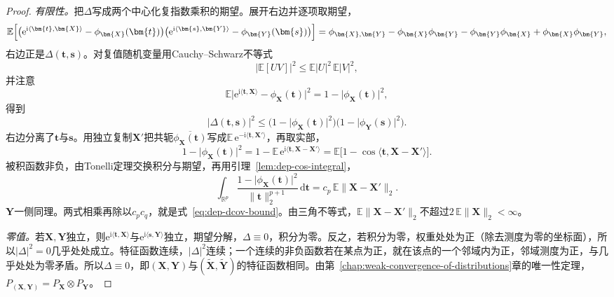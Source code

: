 \begin{proof}
\emph{有限性。}把$\Delta$写成两个中心化复指数乘积的期望。展开右边并逐项取期望，
\[
  \mathbb{E}\Bigl[\bigl(\mathrm{e}^{\mathrm{i}\langle\bm{t},\bm{X}\rangle}-\phi_{\bm{X}}(\bm{t})\bigr)\bigl(\mathrm{e}^{\mathrm{i}\langle\bm{s},\bm{Y}\rangle}-\phi_{\bm{Y}}(\bm{s})\bigr)\Bigr]=\phi_{\bm{X},\bm{Y}}-\phi_{\bm{X}}\phi_{\bm{Y}}-\phi_{\bm{Y}}\phi_{\bm{X}}+\phi_{\bm{X}}\phi_{\bm{Y}},
\]
右边正是$\Delta(\bm{t},\bm{s})$。对复值随机变量用Cauchy--Schwarz不等式
\[
  \lvert\mathbb{E}[UV]\rvert^{2}\leq\mathbb{E}\lvert U\rvert^{2}\,\mathbb{E}\lvert V\rvert^{2},
\]
并注意
\[
  \mathbb{E}\bigl\lvert\mathrm{e}^{\mathrm{i}\langle\bm{t},\bm{X}\rangle}-\phi_{\bm{X}}(\bm{t})\bigr\rvert^{2}=1-\lvert\phi_{\bm{X}}(\bm{t})\rvert^{2},
\]
得到
\[
  \lvert\Delta(\bm{t},\bm{s})\rvert^{2}\leq\bigl(1-\lvert\phi_{\bm{X}}(\bm{t})\rvert^{2}\bigr)\bigl(1-\lvert\phi_{\bm{Y}}(\bm{s})\rvert^{2}\bigr).
\]
右边分离了$\bm{t}$与$\bm{s}$。用独立复制$\bm{X}'$把共轭$\overline{\phi_{\bm{X}}(\bm{t})}$写成$\mathbb{E}\,\mathrm{e}^{-\mathrm{i}\langle\bm{t},\bm{X}'\rangle}$，再取实部，
\[
  1-\lvert\phi_{\bm{X}}(\bm{t})\rvert^{2}=1-\mathbb{E}\,\mathrm{e}^{\mathrm{i}\langle\bm{t},\bm{X}-\bm{X}'\rangle}=\mathbb{E}\bigl[1-\cos\langle\bm{t},\bm{X}-\bm{X}'\rangle\bigr].
\]被积函数非负，由Tonelli定理交换积分与期望，再用引理~\ref{lem:dep-cos-integral}，
\[
  \int_{\mathbb{R}^{p}}\frac{1-\lvert\phi_{\bm{X}}(\bm{t})\rvert^{2}}{\lVert\bm{t}\rVert_2^{p+1}}\,\mathrm{d}\bm{t}=c_p\,\mathbb{E}\lVert\bm{X}-\bm{X}'\rVert_2 .
\]
$\bm{Y}$一侧同理。两式相乘再除以$c_pc_q$，就是式~\eqref{eq:dep-dcov-bound}。由三角不等式，$\mathbb{E}\lVert\bm{X}-\bm{X}'\rVert_2$不超过$2\,\mathbb{E}\lVert\bm{X}\rVert_2<\infty$。

\emph{零值。}若$\bm{X},\bm{Y}$独立，则$\mathrm{e}^{\mathrm{i}\langle\bm{t},\bm{X}\rangle}$与$\mathrm{e}^{\mathrm{i}\langle\bm{s},\bm{Y}\rangle}$独立，期望分解，$\Delta\equiv0$，积分为零。反之，若积分为零，权重处处为正（除去测度为零的坐标面），所以$\lvert\Delta\rvert^{2}=0$几乎处处成立。特征函数连续，$\lvert\Delta\rvert^{2}$连续；一个连续的非负函数若在某点为正，就在该点的一个邻域内为正，邻域测度为正，与几乎处处为零矛盾。所以$\Delta\equiv0$，即$(\bm{X},\bm{Y})$与$(\tilde{\bm{X}},\tilde{\bm{Y}})$的特征函数相同。由第~\ref{chap:weak-convergence-of-distributions}章的唯一性定理，$P_{(\bm{X},\bm{Y})}=P_{\bm{X}}\otimes P_{\bm{Y}}$。
\end{proof}

